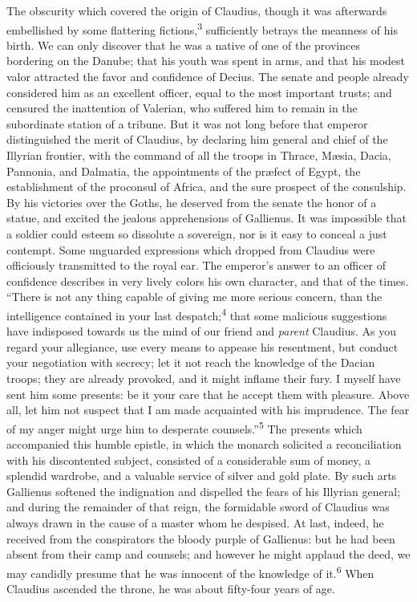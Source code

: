 
The obscurity which covered the origin of Claudius, though it was
afterwards embellished by some flattering fictions,\textsuperscript{3}
sufficiently betrays the meanness of his birth. We can only
discover that he was a native of one of the provinces bordering
on the Danube; that his youth was spent in arms, and that his
modest valor attracted the favor and confidence of Decius. The
senate and people already considered him as an excellent officer,
equal to the most important trusts; and censured the inattention
of Valerian, who suffered him to remain in the subordinate
station of a tribune. But it was not long before that emperor
distinguished the merit of Claudius, by declaring him general and
chief of the Illyrian frontier, with the command of all the
troops in Thrace, Mæsia, Dacia, Pannonia, and Dalmatia, the
appointments of the præfect of Egypt, the establishment of the
proconsul of Africa, and the sure prospect of the consulship. By
his victories over the Goths, he deserved from the senate the
honor of a statue, and excited the jealous apprehensions of
Gallienus. It was impossible that a soldier could esteem so
dissolute a sovereign, nor is it easy to conceal a just contempt.
Some unguarded expressions which dropped from Claudius were
officiously transmitted to the royal ear. The emperor’s answer to
an officer of confidence describes in very lively colors his own
character, and that of the times. “There is not any thing capable
of giving me more serious concern, than the intelligence
contained in your last despatch;\textsuperscript{4} that some malicious
suggestions have indisposed towards us the mind of our friend and
\textit{parent} Claudius. As you regard your allegiance, use every means
to appease his resentment, but conduct your negotiation with
secrecy; let it not reach the knowledge of the Dacian troops;
they are already provoked, and it might inflame their fury. I
myself have sent him some presents: be it your care that he
accept them with pleasure. Above all, let him not suspect that I
am made acquainted with his imprudence. The fear of my anger
might urge him to desperate counsels.”\textsuperscript{5} The presents which
accompanied this humble epistle, in which the monarch solicited a
reconciliation with his discontented subject, consisted of a
considerable sum of money, a splendid wardrobe, and a valuable
service of silver and gold plate. By such arts Gallienus softened
the indignation and dispelled the fears of his Illyrian general;
and during the remainder of that reign, the formidable sword of
Claudius was always drawn in the cause of a master whom he
despised. At last, indeed, he received from the conspirators the
bloody purple of Gallienus: but he had been absent from their
camp and counsels; and however he might applaud the deed, we may
candidly presume that he was innocent of the knowledge of it.\textsuperscript{6}
When Claudius ascended the throne, he was about fifty-four years
of age.

